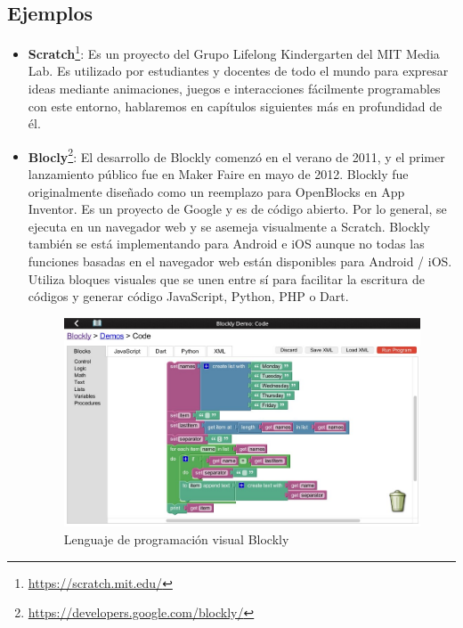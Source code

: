\subsection{Ejemplos}
\label{subsec:tipos}

\begin{itemize}

\item \textbf{Scratch}\footnote{\url{https://scratch.mit.edu/}}: Es un proyecto del Grupo Lifelong Kindergarten del MIT Media Lab.
Es utilizado por estudiantes y docentes de todo el mundo para expresar ideas mediante animaciones, juegos e interacciones fácilmente programables con este entorno, hablaremos en capítulos siguientes más en profundidad de él.

\item \textbf{Blocly}\footnote{\url{https://developers.google.com/blockly/}}: El desarrollo de Blockly comenzó en el verano de 2011, y el primer lanzamiento público fue en Maker Faire en mayo de 2012. Blockly fue originalmente diseñado como un reemplazo para OpenBlocks en App Inventor. Es un proyecto de Google y es de código abierto. Por lo general, se ejecuta en un navegador web y se asemeja visualmente a Scratch. Blockly también se está implementando para Android e iOS aunque no todas las funciones basadas en el navegador web están disponibles para Android / iOS.
Utiliza bloques visuales que se unen entre sí para facilitar la escritura de códigos y generar código JavaScript, Python, PHP o Dart.

\begin{figure}[H]
    \centering
    \includegraphics[scale=0.40]{img/blockly.jpg}
  	\caption{Lenguaje de programación visual Blockly}
  	\label{fig:blockly}
\end{figure}


\end{itemize}

